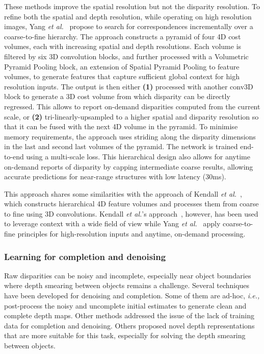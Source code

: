 \documentclass[10pt,journal,compsoc]{IEEEtran}
\newcommand{\ie}{\emph{i.e., }}
\newcommand{\etal}{\emph{et al.}}
\newcommand{\noi}{\noindent}
\begin{document}
\noi These methods improve the spatial resolution but not the disparity resolution.  To refine both the spatial and depth resolution, while operating on high resolution images, Yang \etal~\cite{Yang_2019_CVPR} propose to search for correspondences incrementally over a coarse-to-fine hierarchy. The approach constructs a pyramid of four 4D cost volumes, each with increasing spatial and depth resolutions.  Each  volume is  filtered by six 3D convolution blocks, and further processed with a Volumetric Pyramid Pooling block, an extension of Spatial Pyramid Pooling to feature volumes, to generate features that capture sufficient global context for high resolution inputs.  The output is then either  \textbf{(1)} processed with another conv3D block to generate a 3D  cost volume from which disparity can be directly regressed. This allows to report  on-demand disparities computed from the current scale, or \textbf{(2)} tri-linearly-upsampled to a higher spatial and disparity resolution so that it can be fused with the next 4D  volume in the pyramid.   To minimise memory requirements, the approach uses striding along the disparity dimensions in the last and second last volumes of the pyramid.  The network is trained end-to-end using a multi-scale loss. This hierarchical design  also allows for anytime on-demand reports of disparity by capping intermediate coarse results, allowing  accurate predictions for near-range structures with low latency (30ms).  

This approach shares some similarities with the approach of Kendall \etal~\cite{kendall2017end}, which  constructs hierarchical 4D feature volumes and processes them from coarse to fine using 3D convolutions.  Kendall \etal's approach~\cite{kendall2017end}, however,  has been used to leverage context with a wide field of view while  Yang \etal~\cite{Yang_2019_CVPR} apply  coarse-to-fine principles for high-resolution inputs and anytime, on-demand processing.  






\subsubsection{Learning for completion and denoising}
\label{sec:disp_completion}

Raw disparities can  be noisy and incomplete, especially near object boundaries where depth smearing between objects remains a challenge. Several techniques have been developed for denoising and completion.  Some of them are ad-hoc, \ie post-process the noisy and uncomplete initial estimates to generate clean and complete depth maps. Other methods addressed the issue of the lack of training data for completion and denoising. Others proposed novel depth representations that are more suitable for this task, especially for solving  the depth smearing between objects.
\end{document}
